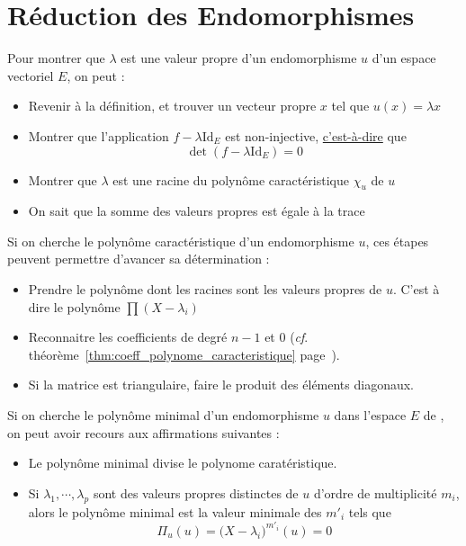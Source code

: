 \documentclass[11pt,a4paper,fleqn,pdftex]{report}
\begin{document}
\chapter{Réduction des Endomorphismes}
\begin{methode}
     Pour montrer que $\lambda$ est une valeur propre d'un endomorphisme $u$ d'un espace vectoriel $E$, on peut : 
     \begin{itemize}
         \item Revenir à la définition, et trouver un vecteur propre $x$ tel que $u(x) = \lambda x$
         \item Montrer que l'application $f - \lambda \mathrm{Id}_E$ est non-injective, \uline{c'est-à-dire} que \[\det (f - \lambda \mathrm{Id}_E) = 0\]
         \item Montrer que $\lambda$ est une racine du polynôme caractéristique $\chi_u$ de $u$
         \item On sait que la somme des valeurs propres est égale à la trace
     \end{itemize}
     Si on cherche le polynôme caractéristique d'un endomorphisme $u$, ces étapes peuvent permettre d'avancer sa détermination :
     \begin{itemize}
         \item Prendre le polynôme dont les racines sont les valeurs propres de $u$. C'est à dire le polynôme $\prod (X - \lambda_i)$
         \item Reconnaitre les coefficients de degré $n-1$ et $0$ (\textit{cf}. théorème~\ref{thm:coeff_polynome_caracteristique} page~\pageref{thm:coeff_polynome_caracteristique}).
         \item Si la matrice est triangulaire, faire le produit des éléments diagonaux.
     \end{itemize}
     Si on cherche le polynôme minimal d'un endomorphisme $u$ dans l'espace $E$ de , on peut avoir recours aux affirmations suivantes :
     \begin{itemize}
         \item Le polynôme minimal divise le polynome caratéristique. 
         \item Si $\lambda_1, \cdots, \lambda_p$ sont des valeurs propres distinctes de $u$ d'ordre de multiplicité $m_i$, alors le polynôme minimal est la valeur minimale des $m'_i$ tels que
         \[
             \Pi_u (u) = \bigg( X - \lambda_i \bigg)^{m'_i} (u) = 0
         \]

\end{itemize}
\end{methode}
\end{document}
